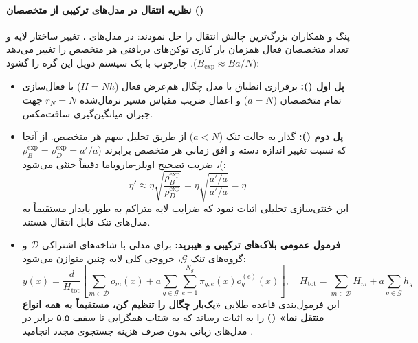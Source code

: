 \paragraph*{نظریه انتقال در مدل‌های ترکیبی از متخصصان ()}
پنگ و همکاران \cite{peng2026completemue} بزرگ‌ترین چالش انتقال را حل نمودند: در مدل‌های ، تغییر ساختار لایه و تعداد متخصصان فعال همزمان بار کاری توکن‌های دریافتی هر متخصص را تغییر می‌دهد ($B_{\text{exp}} \approx B a/N$). چارچوب  با یک سیستم دوپل این گره را گشود:
\begin{itemize}
    \item \textbf{پل اول ():} برقراری انطباق با مدل چگال هم‌عرض فعال ($H = Nh$) با فعال‌سازی تمام متخصصان ($a = N$) و اعمال ضریب مقیاس مسیر نرمال‌شده $r_N = N$ جهت جبران میانگین‌گیری سافت‌مکس.
    \item \textbf{پل دوم ():} گذار به حالت تنک ($a < N$) از طریق تحلیل  سهم هر متخصص. از آنجا که نسبت تغییر اندازه دسته و افق زمانی هر متخصص برابرند ($\rho_B^{\text{exp}} = \rho_D^{\text{exp}} = a'/a$)، ضریب تصحیح اویلر-مارویاما دقیقاً خنثی می‌شود:
    \begin{equation}
        \eta' \approx \eta \sqrt{\frac{\rho_B^{\text{exp}}}{\rho_D^{\text{exp}}}} = \eta \sqrt{\frac{a'/a}{a'/a}} = \eta
    \end{equation}
    این خنثی‌سازی تحلیلی اثبات نمود که ضرایب لایه متراکم به طور پایدار مستقیماً به مدل‌های تنک قابل انتقال هستند.
    \item \textbf{فرمول عمومی بلاک‌های ترکیبی و هیبرید:} برای مدلی با شاخه‌های اشتراکی $\mathcal{D}$ و گروه‌های تنک $\mathcal{G}$، خروجی کلی لایه چنین متوازن می‌شود:
    \begin{equation}
        y(x) = \frac{d}{H_{\text{tot}}} \left[ \sum_{m \in \mathcal{D}} o_m(x) + a \sum_{g \in \mathcal{G}} \sum_{e=1}^{N_g} \pi_{g,e}(x) o_g^{(e)}(x) \right], \quad H_{\text{tot}} = \sum_{m \in \mathcal{D}} H_m + a \sum_{g \in \mathcal{G}} h_g
    \end{equation}
    این فرمول‌بندی قاعده طلایی \textbf{«یک‌بار چگال را تنظیم کن، مستقیماً به همه انواع  منتقل نما» ()} را به اثبات رساند که به شتاب همگرایی تا سقف ۵.۵ برابر در مدل‌های زبانی بدون صرف هزینه جستجوی مجدد انجامید \cite{peng2026completemue}.
\end{itemize}

